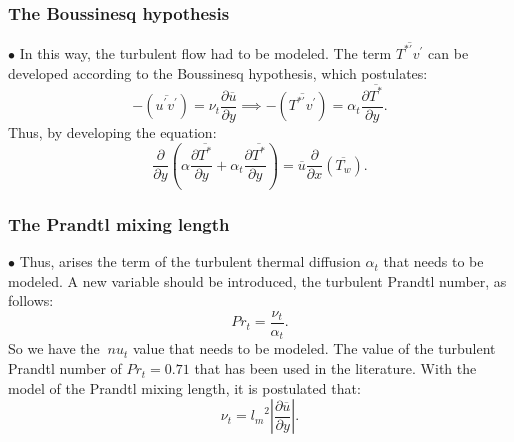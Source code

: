 \documentclass[xcolor=dvipsnames,8pt,aspectratio=34]{beamer}
\begin{document}
		
		\begin{frame}
			\frametitle{The Boussinesq hypothesis}
			$\bullet$ In this way, the turbulent flow had to be modeled. The term $\overline{T^{\ast\prime}  v^\prime}$ 
			can be developed according to the Boussinesq hypothesis, which postulates:
			\begin{equation}\label{bou}
			-\left(\overline{ u^\prime  v^\prime}\right) = 
			\nu_t \frac{\partial{\overline{u}}}{\partial{y}}
			\implies
			-\left(\overline{ T^{\ast\prime}  v^\prime}\right) = 
			\alpha_t \frac{\partial{\overline{T^\ast}}}{\partial{y}}.
			\end{equation}
			Thus, by developing the equation:
			\\
				\begin{equation}
				{\frac{\partial{}}{\partial{y}}} \left(\alpha {\frac{\partial{\overline{T^\ast}}}{\partial{y}}}   
				+ \alpha_t  \frac{\partial \overline{T^\ast}}{\partial y} \right)
				= 
				\overline{u}\frac{\partial{}}{\partial{x}}\left(\overline{T_w}\right) . 
				\end{equation}
		\end{frame}
	
	
	
	
		
		\begin{frame}
			\frametitle{The Prandtl mixing length}
			$\bullet$ Thus, arises the term of the turbulent thermal diffusion $\alpha_t$ that needs to be modeled. A new variable should be introduced, the turbulent Prandtl number, as follows:
			\begin{equation}
				Pr_t = \frac{\nu_t}{\alpha_t}.
			\end{equation} 
			So we have the $ \ nu_t $ value that needs to be modeled. The value of the turbulent Prandtl number of $ Pr_t = 0.71 $ that has been used in the literature.
			With the model of the Prandtl mixing length, it is postulated that:
			\begin{equation}
			\nu_t = {l_m}^2 \left| \frac{\partial \overline{u}}{\partial y} \right|.
			\end{equation}
		\end{frame}
		
		
		
		
		
\end{document}
